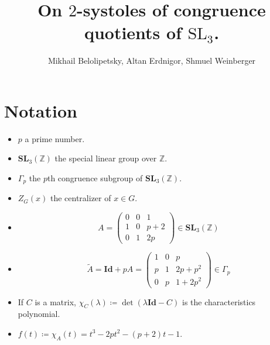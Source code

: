 \documentclass[a4paper]{article}
\DeclareMathOperator{\assign}{\coloneqq}        %
\newcommand{\Id}{\mathbf{Id}}        %
\newcommand{\SL}{\mathbf{SL}_3(\mathbb{Z})}        %
\newcommand{\SLp}{\Gamma_p}        %
\begin{document}
\title{On $2$-systoles of congruence quotients of $\mathrm{SL}_3$.}	
\author{Mikhail Belolipetsky, Altan Erdnigor, Shmuel Weinberger}
\maketitle

\section{Notation}
\begin{itemize}
\item $p$ a prime number.
\item $\SL$ the special linear group over $\mathbb{Z}$.
\item $\SLp$ the $p$th congruence subgroup of $\SL$.
\item $Z_G(x)$ the centralizer of $x \in G$.
\item 
\begin{equation}
\label{matrix_small}
A = 
\begin{pmatrix}
0 & 0 & 1 \\
1 & 0 & p+2 \\
0 & 1 & 2p
\end{pmatrix}
\in \SL
\end{equation}
\item 
\begin{equation}
\label{matrix_big}
\tilde A = \Id + p A =
\begin{pmatrix}
1 & 0 & p \\
p & 1 & 2 p + p^2 \\
0 & p & 1 + 2 p^2
\end{pmatrix}
\in \SLp
\end{equation}

\item If $C$ is a matrix, $\chi_C(\lambda) \assign \det(\lambda \Id - C)$ is the characteristics polynomial.
\item $ f(t) \assign \chi_A(t) = t^3 - 2p t^2 - (p + 2) t - 1$.

\end{itemize}
\end{document}
